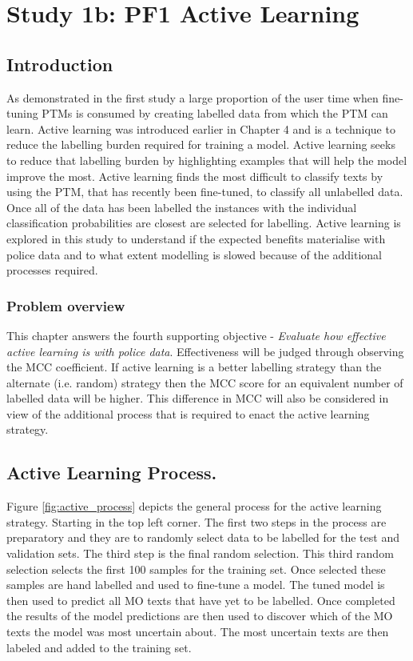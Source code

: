 \chapter{Study 1b: PF1 Active Learning}


\section{Introduction} As demonstrated in the first study a large proportion of the user time when fine-tuning PTMs is consumed by creating labelled data from which the PTM can learn. Active learning was introduced earlier in Chapter 4 and is a technique to reduce the labelling burden required for training a model. Active learning seeks to reduce that labelling burden by highlighting examples that will help the model improve the most. Active learning finds the most difficult to classify texts by using the PTM, that has recently been fine-tuned, to classify all unlabelled data. Once all of the data has been labelled the instances with the individual classification probabilities are closest are selected for labelling. Active learning is explored in this study to understand if the expected benefits materialise with police data and to what extent modelling is slowed because of the additional processes required.

\subsection{Problem overview}

This chapter answers the fourth supporting objective - \emph{Evaluate how effective active learning is with police data}.  Effectiveness will be judged through observing the MCC coefficient. If active learning is a better labelling strategy than the alternate (i.e. random) strategy then the MCC score for an equivalent number of labelled data will be higher. This difference in MCC will also be considered in view of the additional process that is required to enact the active learning strategy.

\section{Active Learning Process.} Figure \ref{fig:active_process} depicts the general process for the active learning strategy. Starting in the top left corner. The first two steps in the process are preparatory and they are to randomly select data to be labelled for the test and validation sets. The third step is the final random selection. This third random selection selects the first 100 samples for the training set. Once selected these samples are hand labelled and used to fine-tune a model. The tuned model is then used to predict all MO texts that have yet to be labelled. Once completed the results of the model predictions are then used to discover which of the MO texts the model was most uncertain about. The most uncertain texts are then labeled and added to the training set.

